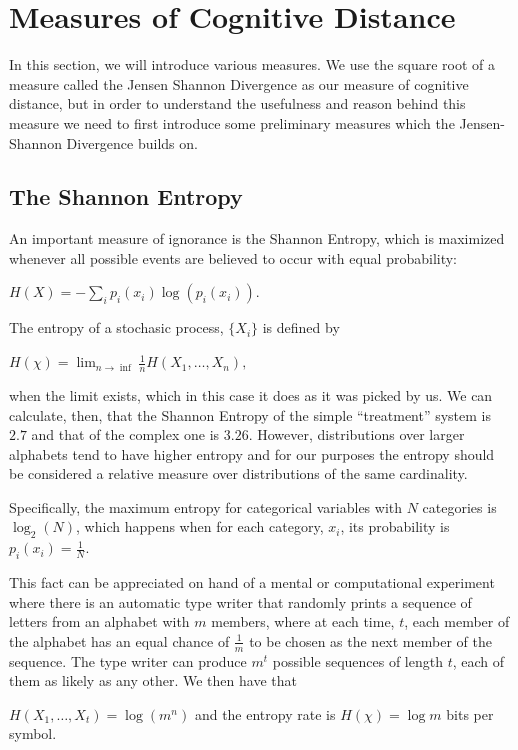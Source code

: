 \section{Measures of Cognitive Distance}

In this section, we will introduce various measures.  We use the square root of a measure called the Jensen Shannon Divergence as our measure of cognitive distance, but in order to understand the usefulness and reason behind this measure we need to first introduce some preliminary measures which the Jensen-Shannon Divergence builds on. 
  
\subsection{The Shannon Entropy}

An important measure of ignorance is the Shannon Entropy, which is maximized whenever all possible events are believed to occur with equal probability:

$H(X)=-\sum_ip_i(x_i)\log(p_i(x_i)).$

The entropy of a stochasic process, $\{X_i\}$ is defined by 

$H(\chi)=\lim_{n\rightarrow\inf}\frac{1}{n}H(X_1, \ldots, X_n),$

when the limit exists, which in this case it does as it was picked by us. 
We can calculate, then, that the Shannon Entropy of the simple ``treatment'' system is $2.7$ and that of the complex one is $3.26$. However, distributions over larger alphabets tend to have higher entropy and for our purposes the entropy should be considered a relative measure over distributions of the same cardinality. 

Specifically, the maximum entropy for categorical variables with $N$ categories is $\log_2(N)$, which happens when for each category, $x_i$, its probability is $p_i(x_i)=\frac{1}{N}$. 

This fact can be appreciated on hand of a mental or computational experiment \citep{Cover13} where there is an automatic type writer that randomly prints a sequence of letters from an alphabet with $m$ members, where at each time, $t$, each member of the alphabet has an equal chance of $\frac{1}{m}$ to be chosen as the next member of the sequence. The type writer can produce $m^t$ possible sequences of length $t$, each of them as likely as any other. We then have that 

$H(X_1, \ldots, X_t)=\log(m^n)$ and the entropy rate is $H(\chi)=\log m$ bits per symbol. 

